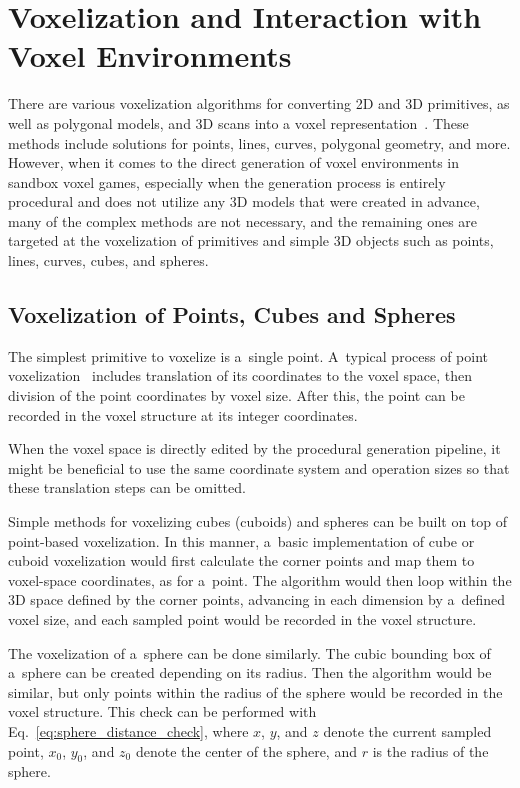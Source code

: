 \section{Voxelization and Interaction with Voxel Environments}
There are various voxelization algorithms for converting 2D and 3D primitives, as well as polygonal models, and 3D scans into a voxel representation~\cite{voxel_algo_data_structs}. These methods include solutions for points, lines, curves, polygonal geometry, and more. However, when it comes to the direct generation of voxel environments in sandbox voxel games, especially when the generation process is entirely procedural and does not utilize any 3D models that were created in advance, many of the complex methods are not necessary, and the remaining ones are targeted at the voxelization of primitives and simple 3D objects such as points, lines, curves, cubes, and spheres.

\subsection{Voxelization of Points, Cubes and Spheres}
The simplest primitive to voxelize is a~single point. A~typical process of point voxelization~\cite{voxel_algo_data_structs} includes translation of its coordinates to the voxel space, then division of the point coordinates by voxel size. After this, the point can be recorded in the voxel structure at its integer coordinates.

When the voxel space is directly edited by the procedural generation pipeline, it might be beneficial to use the same coordinate system and operation sizes so that these translation steps can be omitted.

Simple methods for voxelizing cubes (cuboids) and spheres can be built on top of point-based voxelization. In this manner, a~basic implementation of cube or cuboid voxelization would first calculate the corner points and map them to voxel-space coordinates, as for a~point. The algorithm would then loop within the 3D space defined by the corner points, advancing in each dimension by a~defined voxel size, and each sampled point would be recorded in the voxel structure.

The voxelization of a~sphere can be done similarly. The cubic bounding box of a~sphere can be created depending on its radius. Then the algorithm would be similar, but only points within the radius of the sphere would be recorded in the voxel structure. This check can be performed with Eq.~\ref{eq:sphere_distance_check}, where $x$, $y$, and $z$ denote the current sampled point, $x_0$, $y_0$, and $z_0$ denote the center of the sphere, and $r$ is the radius of the sphere.

